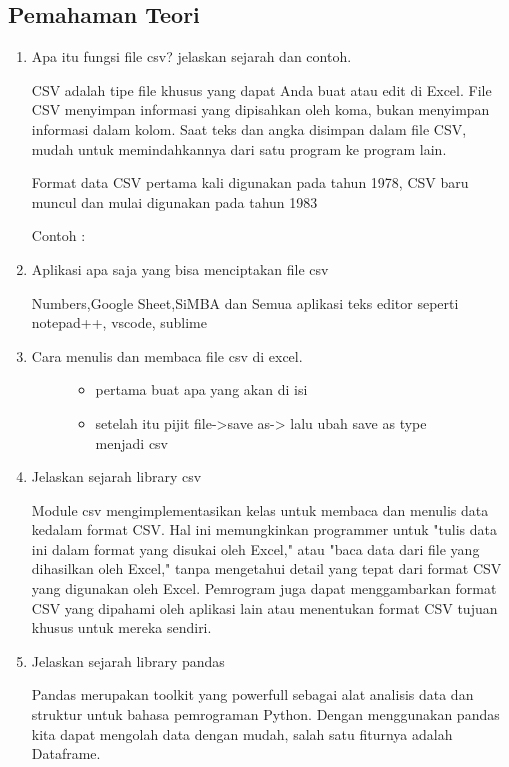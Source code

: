 \subsection{Pemahaman Teori}
\begin{enumerate}
\item Apa itu fungsi file csv? jelaskan sejarah dan contoh.

CSV adalah tipe file khusus yang dapat Anda buat atau edit di Excel. File CSV menyimpan informasi yang dipisahkan oleh koma, bukan menyimpan informasi dalam kolom. Saat teks dan angka disimpan dalam file CSV, mudah untuk memindahkannya dari satu program ke program lain. 

Format data CSV pertama kali digunakan pada tahun 1978, CSV baru muncul dan mulai digunakan pada tahun 1983 

Contoh :


\item Aplikasi apa saja yang bisa menciptakan file csv

Numbers,Google Sheet,SiMBA dan Semua aplikasi teks editor seperti notepad++, vscode, sublime 

\item Cara menulis dan membaca file csv di excel.
\begin{figure}
\begin{itemize}
	\item pertama buat apa yang akan di isi
	\item setelah itu pijit file->save as-> lalu ubah save as type menjadi csv

\end{itemize}
\end{figure}
\item Jelaskan sejarah library csv

Module csv mengimplementasikan kelas untuk membaca dan menulis data kedalam format CSV. Hal ini memungkinkan programmer untuk "tulis data ini dalam format yang disukai oleh Excel," atau "baca data dari file yang dihasilkan oleh Excel," tanpa mengetahui detail yang tepat dari format CSV yang digunakan oleh Excel. Pemrogram juga dapat menggambarkan format CSV yang dipahami oleh aplikasi lain atau menentukan format CSV tujuan khusus untuk mereka sendiri.

\item Jelaskan sejarah library pandas

Pandas merupakan toolkit yang powerfull sebagai alat analisis data dan struktur untuk bahasa pemrograman Python. Dengan menggunakan pandas kita dapat mengolah data dengan mudah, salah satu fiturnya adalah Dataframe.


\end{enumerate}
